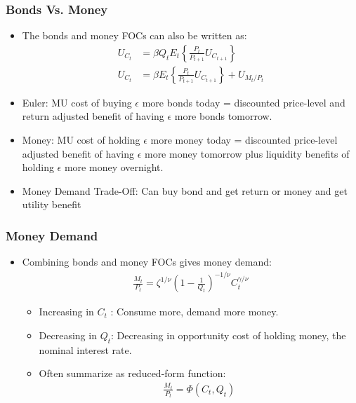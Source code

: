 \documentclass[english,xcolor=svgnames]{beamer}
\begin{document}
\begin{frame}
\frametitle{Bonds Vs. Money
}
\begin{itemize}
	\item The bonds and money FOCs can also be written as:
\begin{align*}
	U_{C_t} &= \beta Q_t E_t\left\{ \frac{P_t}{P_{t+1}} U_{C_{t+1}}\right\} \\
	U_{C_t} &= \beta E_t\left\{ \frac{P_t}{P_{t+1}} U_{C_{t+1}}\right\} + U_{M_t/P_t} 
\end{align*}
	\item Euler: MU cost of buying $\epsilon$ more bonds today = discounted price-level and return adjusted benefit of having $\epsilon$ more bonds tomorrow.
	\item Money: MU cost of holding $\epsilon$ more money today = discounted price-level adjusted benefit of having $\epsilon$ more money tomorrow plus liquidity benefits of holding $\epsilon$ more money overnight.
	\item Money Demand Trade-Off: Can buy bond and get return or money and get utility benefit
\end{itemize}
\end{frame}


\begin{frame}
\frametitle{Money Demand
}
\begin{itemize}
	\item Combining bonds and money FOCs gives money demand:
	\begin{align*}
		\frac{M_t}{P_t}=\zeta^{1/\nu}\left(1-\frac{1}{Q_t}\right)^{-1/\nu}C_{t}^{\gamma/\nu}
	\end{align*}
\begin{itemize}
	\item Increasing in $C_t$ : Consume more, demand more money.
	\item Decreasing in $Q_t$: Decreasing in opportunity cost of holding money, the nominal interest rate.
	\item Often summarize as reduced-form function:
	\begin{align*}
		\frac{M_t}{P_t}=\Phi(C_t,Q_t)
	\end{align*}
\end{itemize}
\end{itemize}
\end{frame}
\end{document}
